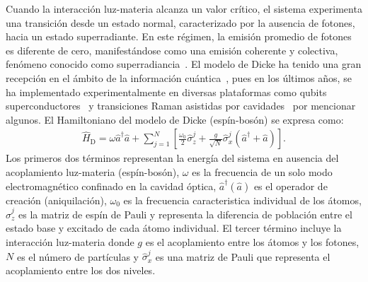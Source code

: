\documentclass[onecolumn,notitlepage,letterpaper,aps,pra,12pt]{article}
\numberwithin{equation}{section}
\begin{document}
Cuando la interacción luz-materia alcanza un valor crítico, el sistema experimenta una transición desde un estado normal, caracterizado por la ausencia de fotones, hacia un estado superradiante. %
En este régimen, la emisión promedio de fotones es diferente de cero, manifestándose como una emisión coherente y colectiva, fenómeno conocido como superradiancia~\cite{gross1982}. El modelo de Dicke ha tenido una gran recepción en el ámbito de la información cuántica~\cite{Garraway2011,Kirton2019,LeBoite2020}, pues en los últimos años, se ha implementado experimentalmente en diversas plataformas como qubits superconductores~\cite{Blais04,Casanova10} y transiciones Raman asistidas por cavidades~\cite{Baden14,Nagy10} por mencionar algunos. El Hamiltoniano del modelo de Dicke (espín-bosón) se expresa como:
\begin{gather}
    \hat{H}_{\text{D}} = \omega\hat{a}^{\dagger}\hat{a} + \sum_{j=1}^{N}\left[ \frac{\omega_{0}}{2}\hat{\sigma}_{z}^{j} + \frac{g}{\sqrt{N}}\hat{\sigma}_{x}^{j}\left(\hat{a}^{\dagger} + \hat{a}\right) \right].
\end{gather}
Los primeros dos términos representan la energía del sistema en ausencia del acoplamiento luz-materia (espín-bosón), $\omega$ es la frecuencia de un solo modo electromagnético confinado en la cavidad óptica, $\hat{a}^{\dagger}(\hat{a})$ es el operador de creación (aniquilación), $\omega_{0}$ es la frecuencia caracteristica individual de los átomos, $\hat{\sigma}_{z}^{j}$ es la matriz de espín de Pauli  y representa la diferencia de población entre el estado base y excitado de cada átomo individual. El tercer término incluye la interacción luz-materia donde $g$ es el acoplamiento entre los átomos y los fotones,  $N$ es el número de partículas y $\hat{\sigma}_{x}^{j}$ es una matriz de Pauli que representa el acoplamiento entre los dos niveles. 
\end{document}
